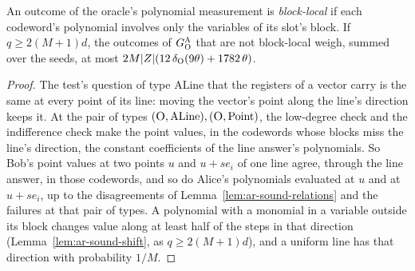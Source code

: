 \begin{lemma}
\label{lem:ar-sound-indifference}
\leanok
An outcome of the oracle's polynomial measurement is \emph{block-local} if each codeword's
polynomial involves only the variables of its slot's block. If $q \geq 2 (M + 1) d$, the outcomes
of $G^{\textsc{A}}_{\textsc{O}}$ that are not block-local weigh, summed over the seeds, at most
$2M |Z| (12\, \delta_{\textsc{O}}(9\theta) + 1782\, \theta)$.
\end{lemma}

\begin{proof}
\leanok
The test's question of type $\mathrm{ALine}$ that the registers of a vector carry is the same at
every point of its line: moving the vector's point along the line's direction keeps it. At the
pair of types $(\textsc{O}, \mathrm{ALine}), (\textsc{O}, \mathrm{Point})$, the low-degree check and the
indifference check make the point values, in the codewords whose blocks miss the line's
direction, the constant coefficients of the line answer's polynomials. So Bob's point values at two
points $u$ and $u + s e_i$ of one line agree, through the line answer, in those codewords, and so do
Alice's polynomials evaluated at $u$ and at $u + s e_i$, up to the disagreements of
Lemma~\ref{lem:ar-sound-relations} and the failures at that pair of types. A polynomial with a
monomial in a variable outside its block changes value along at least half of the steps in that
direction (Lemma~\ref{lem:ar-sound-shift}, as $q \geq 2 (M + 1) d$), and a uniform line has that
direction with probability $1/M$.
\end{proof}

